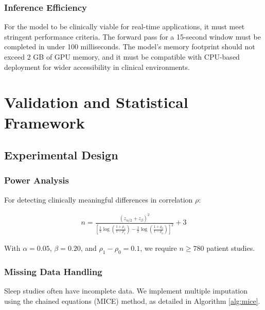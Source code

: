 \documentclass[11pt,en]{elegantpaper}
\begin{document}
\subsubsection{Inference Efficiency}
For the model to be clinically viable for real-time applications, it must meet stringent performance criteria. The forward pass for a 15-second window must be completed in under 100 milliseconds. The model's memory footprint should not exceed 2 GB of GPU memory, and it must be compatible with CPU-based deployment for wider accessibility in clinical environments.

\section{Validation and Statistical Framework}

\subsection{Experimental Design}

\subsubsection{Power Analysis}
For detecting clinically meaningful differences in correlation $\rho$:

\begin{align}
n = \frac{(z_{\alpha/2} + z_\beta)^2}{[\frac{1}{2}\log(\frac{1+\rho_1}{1-\rho_1}) - \frac{1}{2}\log(\frac{1+\rho_0}{1-\rho_0})]^2} + 3
\end{align}

With $\alpha = 0.05$, $\beta = 0.20$, and $\rho_1 - \rho_0 = 0.1$, we require $n \geq 780$ patient studies.

\subsubsection{Missing Data Handling}
Sleep studies often have incomplete data. We implement multiple imputation using the chained equations (MICE) method, as detailed in Algorithm \ref{alg:mice}.
\end{document}
